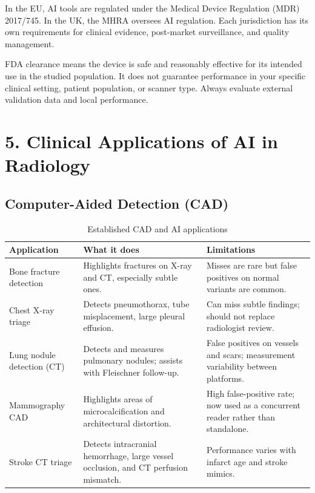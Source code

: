 In the EU, AI tools are regulated under the Medical Device Regulation (MDR) 2017/745. In the UK, the MHRA oversees AI regulation. Each jurisdiction has its own requirements for clinical evidence, post-market surveillance, and quality management.

\begin{warnbox}
FDA clearance means the device is safe and reasonably effective for its intended use in the studied population. It does not guarantee performance in your specific clinical setting, patient population, or scanner type. Always evaluate external validation data and local performance.
\end{warnbox}


\section*{5. Clinical Applications of AI in Radiology}

\subsection*{Computer-Aided Detection (CAD)}

\begin{table}[h]
\centering
\caption{Established CAD and AI applications}
\begin{tabular}{|l|p{5cm}|p{5cm}|}
\hline
\textbf{Application} & \textbf{What it does} & \textbf{Limitations} \\
\hline
Bone fracture detection & Highlights fractures on X-ray and CT, especially subtle ones. & Misses are rare but false positives on normal variants are common. \\
\hline
Chest X-ray triage & Detects pneumothorax, tube misplacement, large pleural effusion. & Can miss subtle findings; should not replace radiologist review. \\
\hline
Lung nodule detection (CT) & Detects and measures pulmonary nodules; assists with Fleischner follow-up. & False positives on vessels and scars; measurement variability between platforms. \\
\hline
Mammography CAD & Highlights areas of microcalcification and architectural distortion. & High false-positive rate; now used as a concurrent reader rather than standalone. \\
\hline
Stroke CT triage & Detects intracranial hemorrhage, large vessel occlusion, and CT perfusion mismatch. & Performance varies with infarct age and stroke mimics. \\
\hline
\end{tabular}
\end{table}

